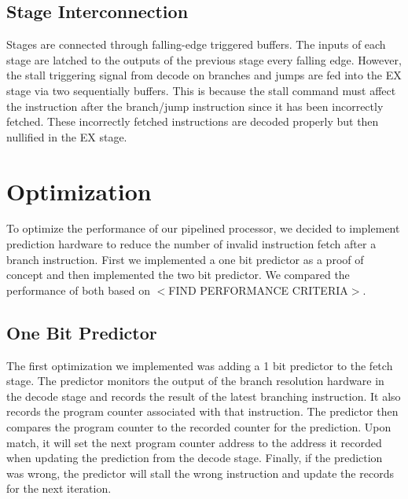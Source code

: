 \documentclass[12pt]{IEEEtran} %
\begin{document}

\subsection{Stage Interconnection} %
\label{sub:stage_interconnection}
Stages are connected through falling-edge triggered buffers. The inputs of each stage are latched to the outputs of the previous stage every falling edge. However, the stall triggering signal from decode on branches and jumps are fed into the EX stage via two sequentially buffers. This is because the stall command must affect the instruction after the branch/jump instruction since it has been incorrectly fetched. These incorrectly fetched instructions are decoded properly but then nullified in the EX stage.




\section{Optimization} %
\label{sec:optimisation}
To optimize the performance of our pipelined processor, we decided to implement prediction hardware to reduce the number of invalid instruction fetch after a branch instruction. First we implemented a one bit predictor as a proof of concept and then implemented the two bit predictor. We compared the performance of both based on $<$FIND PERFORMANCE CRITERIA$>$.

\subsection{One Bit Predictor} %
\label{sec:1_bit_predictor}
The first optimization we implemented was adding a 1 bit predictor to the fetch stage. The predictor monitors the output of the branch resolution hardware in the decode stage and records the result of the latest branching instruction. It also records the program counter associated with that instruction. The predictor then compares the program counter to the recorded counter for the prediction. Upon match, it will set the next program counter address to the address it recorded when updating the prediction from the decode stage. Finally, if the prediction was wrong, the predictor will stall the wrong instruction and update the records for the next iteration.  
\end{document}
